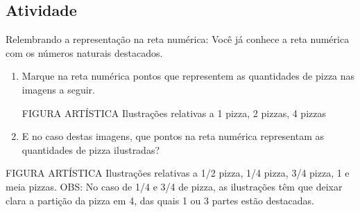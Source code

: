 \documentclass[a4,12pt]{book}
\begin{document}
\subsection{Atividade}

Relembrando a representação na reta numérica: Você já conhece a reta numérica com os números naturais destacados.


\begin{enumerate} [\quad a)] %
  \item     Marque na reta numérica pontos que representem as quantidades de pizza nas imagens a seguir. 

\begin{imagem*}[breakable]{}{}   FIGURA ARTÍSTICA 
Ilustrações relativas a 1 pizza, 2 pizzas, 4 pizzas
\end{imagem*}

\begin{center}
\end{center}

\item     E no caso destas imagens, que pontos na reta numérica representam as quantidades de pizza ilustradas?
\end{enumerate} %


\begin{imagem*}[breakable]{}{}   FIGURA ARTÍSTICA   \mbox{} \newline    Ilustrações relativas a 1/2 pizza,  1/4 pizza, 3/4 pizza, 1 e meia pizzas. OBS: No caso de 1/4 e 3/4 de pizza, as ilustrações têm que deixar clara a partição da pizza em 4, das quais 1 ou 3 partes estão destacadas.
  \end{imagem*}

  \begin{center}
\end{center}
  
\end{document}
